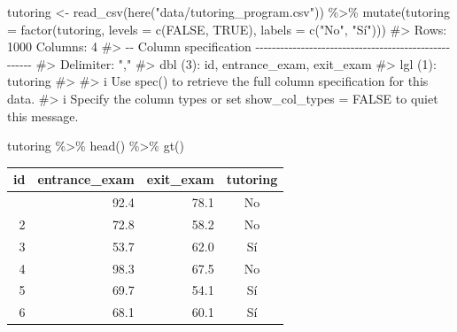 \documentclass[
  letterpaper,
  DIV=11,
  numbers=noendperiod,
  oneside]{scrreprt}
\newenvironment{Shaded}{\begin{snugshade}}{\end{snugshade}}
\newcommand{\AttributeTok}[1]{\textcolor[rgb]{0.40,0.45,0.13}{#1}}
\newcommand{\CommentTok}[1]{\textcolor[rgb]{0.37,0.37,0.37}{#1}}
\newcommand{\ConstantTok}[1]{\textcolor[rgb]{0.56,0.35,0.01}{#1}}
\newcommand{\FunctionTok}[1]{\textcolor[rgb]{0.28,0.35,0.67}{#1}}
\newcommand{\NormalTok}[1]{\textcolor[rgb]{0.00,0.23,0.31}{#1}}
\newcommand{\OtherTok}[1]{\textcolor[rgb]{0.00,0.23,0.31}{#1}}
\newcommand{\SpecialCharTok}[1]{\textcolor[rgb]{0.37,0.37,0.37}{#1}}
\newcommand{\StringTok}[1]{\textcolor[rgb]{0.13,0.47,0.30}{#1}}
\begin{document}
\begin{Shaded}
\begin{Highlighting}[]
\NormalTok{tutoring }\OtherTok{\textless{}{-}} \FunctionTok{read\_csv}\NormalTok{(}\FunctionTok{here}\NormalTok{(}\StringTok{"data/tutoring\_program.csv"}\NormalTok{)) }\SpecialCharTok{\%\textgreater{}\%} 
  \FunctionTok{mutate}\NormalTok{(}\AttributeTok{tutoring =} \FunctionTok{factor}\NormalTok{(tutoring, }\AttributeTok{levels =} \FunctionTok{c}\NormalTok{(}\ConstantTok{FALSE}\NormalTok{, }\ConstantTok{TRUE}\NormalTok{), }
                           \AttributeTok{labels =} \FunctionTok{c}\NormalTok{(}\StringTok{"No"}\NormalTok{, }\StringTok{"Sí"}\NormalTok{)))}
\CommentTok{\#\textgreater{} Rows: 1000 Columns: 4}
\CommentTok{\#\textgreater{} {-}{-} Column specification {-}{-}{-}{-}{-}{-}{-}{-}{-}{-}{-}{-}{-}{-}{-}{-}{-}{-}{-}{-}{-}{-}{-}{-}{-}{-}{-}{-}{-}{-}{-}{-}{-}{-}{-}{-}{-}{-}{-}{-}{-}{-}{-}{-}{-}{-}{-}{-}{-}{-}{-}{-}{-}}
\CommentTok{\#\textgreater{} Delimiter: ","}
\CommentTok{\#\textgreater{} dbl (3): id, entrance\_exam, exit\_exam}
\CommentTok{\#\textgreater{} lgl (1): tutoring}
\CommentTok{\#\textgreater{} }
\CommentTok{\#\textgreater{} i Use \textasciigrave{}spec()\textasciigrave{} to retrieve the full column specification for this data.}
\CommentTok{\#\textgreater{} i Specify the column types or set \textasciigrave{}show\_col\_types = FALSE\textasciigrave{} to quiet this message.}

\NormalTok{tutoring }\SpecialCharTok{\%\textgreater{}\%}
  \FunctionTok{head}\NormalTok{() }\SpecialCharTok{\%\textgreater{}\%}
  \FunctionTok{gt}\NormalTok{()}
\end{Highlighting}
\end{Shaded}

\begin{table}
\fontsize{12.0pt}{14.4pt}\selectfont
\begin{tabular*}{\linewidth}{@{\extracolsep{\fill}}rrrc}
\toprule
id & entrance\_exam & exit\_exam & tutoring \\ 
\midrule\addlinespace[2.5pt]
1 & 92.4 & 78.1 & No \\ 
2 & 72.8 & 58.2 & No \\ 
3 & 53.7 & 62.0 & Sí \\ 
4 & 98.3 & 67.5 & No \\ 
5 & 69.7 & 54.1 & Sí \\ 
6 & 68.1 & 60.1 & Sí \\ 
\bottomrule
\end{tabular*}
\end{table}
\end{document}
